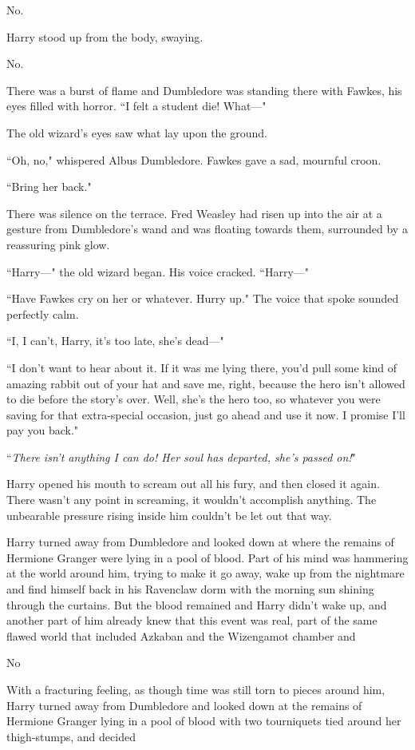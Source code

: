 No.

Harry stood up from the body, swaying.

No.

There was a burst of flame and Dumbledore was standing there with Fawkes, his eyes filled with horror. ``I felt a student die! What—"

The old wizard's eyes saw what lay upon the ground.

``Oh, no," whispered Albus Dumbledore. Fawkes gave a sad, mournful croon.

``Bring her back."

There was silence on the terrace. Fred Weasley had risen up into the air at a gesture from Dumbledore's wand and was floating towards them, surrounded by a reassuring pink glow.

``Harry—" the old wizard began. His voice cracked. ``Harry—"

``Have Fawkes cry on her or whatever. Hurry up." The voice that spoke sounded perfectly calm.

``I, I can't, Harry, it's too late, she's dead—"

``I don't want to hear about it. If it was me lying there, you'd pull some kind of amazing rabbit out of your hat and save me, right, because the hero isn't allowed to die before the story's over. Well, she's the hero too, so whatever you were saving for that extra-special occasion, just go ahead and use it now. I promise I'll pay you back."

``\emph{There isn't anything I can do! Her soul has departed, she's passed on!}"

Harry opened his mouth to scream out all his fury, and then closed it again. There wasn't any point in screaming, it wouldn't accomplish anything. The unbearable pressure rising inside him couldn't be let out that way.

Harry turned away from Dumbledore and looked down at where the remains of Hermione Granger were lying in a pool of blood. Part of his mind was hammering at the world around him, trying to make it go away, wake up from the nightmare and find himself back in his Ravenclaw dorm with the morning sun shining through the curtains. But the blood remained and Harry didn't wake up, and another part of him already knew that this event was real, part of the same flawed world that included Azkaban and the Wizengamot chamber and

No

With a fracturing feeling, as though time was still torn to pieces around him, Harry turned away from Dumbledore and looked down at the remains of Hermione Granger lying in a pool of blood with two tourniquets tied around her thigh-stumps, and decided

